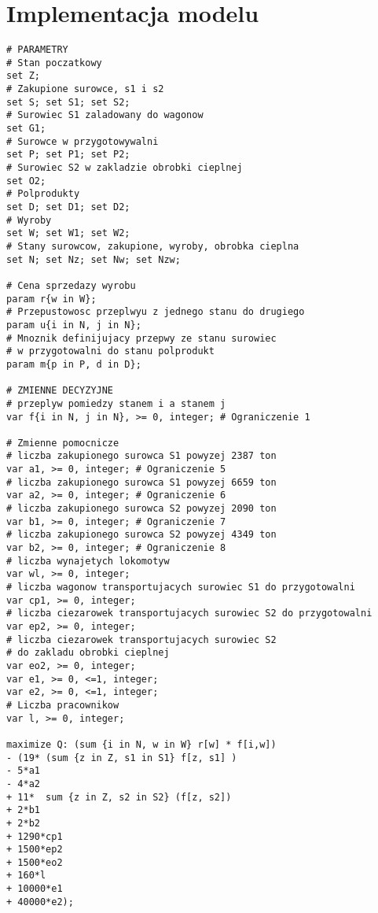 \documentclass[12pt]{article}
\begin{document}
\section{Implementacja modelu}
\begin{lstlisting}[caption= plik mod]
# PARAMETRY
# Stan poczatkowy
set Z;
# Zakupione surowce, s1 i s2
set S; set S1; set S2;
# Surowiec S1 zaladowany do wagonow
set G1;
# Surowce w przygotowywalni
set P; set P1; set P2;
# Surowiec S2 w zakladzie obrobki cieplnej
set O2;
# Polprodukty 
set D; set D1; set D2;
# Wyroby
set W; set W1; set W2;
# Stany surowcow, zakupione, wyroby, obrobka cieplna
set N; set Nz; set Nw; set Nzw;

# Cena sprzedazy wyrobu
param r{w in W};
# Przepustowosc przeplwyu z jednego stanu do drugiego
param u{i in N, j in N};
# Mnoznik definijujacy przepwy ze stanu surowiec
# w przygotowalni do stanu polprodukt
param m{p in P, d in D};

# ZMIENNE DECYZYJNE
# przeplyw pomiedzy stanem i a stanem j
var f{i in N, j in N}, >= 0, integer; # Ograniczenie 1

# Zmienne pomocnicze
# liczba zakupionego surowca S1 powyzej 2387 ton
var a1, >= 0, integer; # Ograniczenie 5
# liczba zakupionego surowca S1 powyzej 6659 ton
var a2, >= 0, integer; # Ograniczenie 6
# liczba zakupionego surowca S2 powyzej 2090 ton
var b1, >= 0, integer; # Ograniczenie 7
# liczba zakupionego surowca S2 powyzej 4349 ton
var b2, >= 0, integer; # Ograniczenie 8
# liczba wynajetych lokomotyw
var wl, >= 0, integer;
# liczba wagonow transportujacych surowiec S1 do przygotowalni
var cp1, >= 0, integer;
# liczba ciezarowek transportujacych surowiec S2 do przygotowalni
var ep2, >= 0, integer; 
# liczba ciezarowek transportujacych surowiec S2
# do zakladu obrobki cieplnej
var eo2, >= 0, integer;
var e1, >= 0, <=1, integer;
var e2, >= 0, <=1, integer;
# Liczba pracownikow
var l, >= 0, integer;

maximize Q: (sum {i in N, w in W} r[w] * f[i,w])
- (19* (sum {z in Z, s1 in S1} f[z, s1] )
- 5*a1 
- 4*a2 
+ 11*  sum {z in Z, s2 in S2} (f[z, s2])
+ 2*b1 
+ 2*b2
+ 1290*cp1
+ 1500*ep2 
+ 1500*eo2 
+ 160*l 
+ 10000*e1 
+ 40000*e2);


\end{lstlisting}
\end{document}
